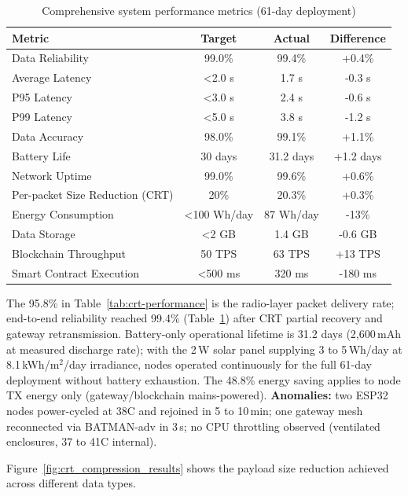 \documentclass[pdflatex,sn-mathphys-num]{sn-jnl}
\theoremstyle{thmstyleone}
\theoremstyle{thmstyletwo}
\theoremstyle{thmstylethree}
\begin{document}
\begin{table}[htbp]
\centering
\caption{Comprehensive system performance metrics (61-day deployment)}
\label{tab:system-performance}
\scriptsize
\begin{tabularx}{\columnwidth}{lccc}
\toprule
\textbf{Metric} & \textbf{Target} & \textbf{Actual} & \textbf{Difference} \\
\midrule
Data Reliability & 99.0\% & 99.4\% & +0.4\% \\
Average Latency & <2.0 s & 1.7 s & -0.3 s \\
P95 Latency & <3.0 s & 2.4 s & -0.6 s \\
P99 Latency & <5.0 s & 3.8 s & -1.2 s \\
Data Accuracy & 98.0\% & 99.1\% & +1.1\% \\
Battery Life & 30 days & 31.2 days & +1.2 days \\
Network Uptime & 99.0\% & 99.6\% & +0.6\% \\
Per-packet Size Reduction (CRT) & 20\% & 20.3\% & +0.3\% \\
Energy Consumption & <100 Wh/day & 87 Wh/day & -13\% \\
Data Storage & <2 GB & 1.4 GB & -0.6 GB \\
Blockchain Throughput & 50 TPS & 63 TPS & +13 TPS \\
Smart Contract Execution & <500 ms & 320 ms & -180 ms \\
\bottomrule
\end{tabularx}
\end{table}

The 95.8\% in Table~\ref{tab:crt-performance} is the radio-layer packet delivery rate; end-to-end reliability reached 99.4\% (Table~\ref{tab:system-performance}) after CRT partial recovery and gateway retransmission. Battery-only operational lifetime is 31.2 days (2,600\,mAh at measured discharge rate); with the 2\,W solar panel supplying 3 to 5\,Wh/day at 8.1\,kWh/m$^2$/day irradiance, nodes operated continuously for the full 61-day deployment without battery exhaustion. The 48.8\% energy saving applies to node TX energy only (gateway/blockchain mains-powered). \textbf{Anomalies:} two ESP32 nodes power-cycled at 38\textdegree{}C and rejoined in 5 to 10\,min; one gateway mesh reconnected via BATMAN-adv in 3\,s; no CPU throttling observed (ventilated enclosures, 37 to 41\textdegree{}C internal).

Figure~\ref{fig:crt_compression_results} shows the payload size reduction achieved across different data types.
\end{document}
